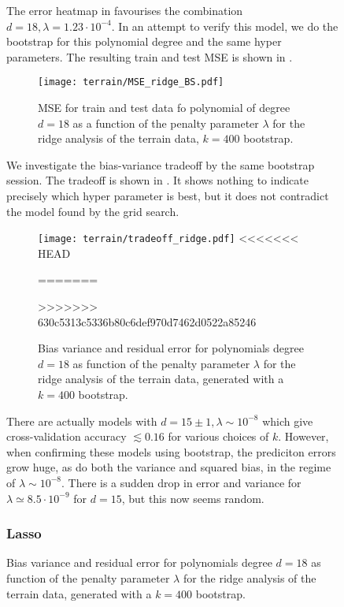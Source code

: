 \begin{figure}
        The error heatmap in  favourises the combination $d=18, \lambda = 1.23\cdot 10^{-4}$. In an attempt to verify this model, we do the bootstrap for this polynomial degree and the same hyper parameters. The resulting train and test MSE is shown in .

        \begin{figure}
            \texttt{[image: terrain/MSE\_ridge\_BS.pdf]}
            \caption{MSE for train and test data fo polynomial of degree $d=18$ as a function of the penalty parameter $\lambda$ for the ridge analysis of the terrain data, $k=400$ bootstrap. }
            \label{fig:gc_model_complexity_ridge}
        \end{figure}

        We investigate the bias-variance tradeoff by the same bootstrap session. The tradeoff is shown in . It shows nothing to indicate precisely which hyper parameter is best, but it does not contradict the model found by the grid search.

        \begin{figure}
            \texttt{[image: terrain/tradeoff\_ridge.pdf]}
<<<<<<< HEAD
            \caption{Bias-variance trade off Ridge}
=======
            \caption{Bias variance and residual error for polynomials degree $d=18$ as function of the penalty parameter $\lambda$ for the ridge analysis of the terrain data, generated with a $k=400$ bootstrap.}
>>>>>>> 630c5313c5336b80c6def970d7462d0522a85246
            \label{fig:gc_bias_variance_ridge}
        \end{figure}

        \par

        There are actually models with $d=15\pm 1, \lambda\sim  10^{-8}$ which give cross-validation accuracy $\lesssim 0.16$ for various choices of $k$. However, when confirming these models using bootstrap, the prediciton errors grow huge, as do both the variance and squared bias, in the regime of $\lambda\sim 10^{-8}$. There is a sudden drop in error and variance for $\lambda \simeq 8.5 \cdot 10^{-9}$ for $d=15$, but this now seems random.


        \subsubsection{Lasso}\label{sec:gc_lassoanalysis}


\end{figure}
